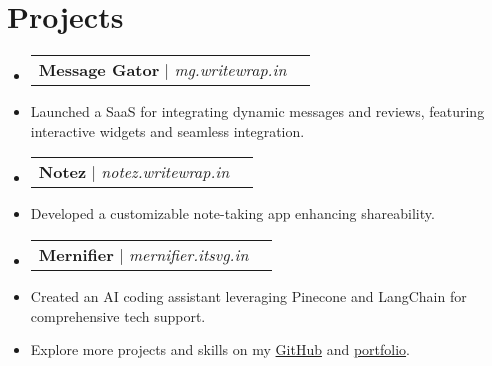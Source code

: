 \documentclass[letterpaper,11pt]{article}
\makeatletter
\newcommand{\resumeItem}[1]{
  \item\small{
    {#1 \vspace{-2pt}}
  }
}
\newcommand{\resumeProjectHeading}[2]{
    \vspace{-2pt}\item
    \begin{tabular*}{0.97\textwidth}{l@{\extracolsep{\fill}}r}
      \small#1 & #2 \\
    \end{tabular*}\vspace{-7pt}
}
\newcommand{\resumeSubHeadingListStart}{\begin{itemize}[leftmargin=0.15in, label={}]}
\newcommand{\resumeSubHeadingListEnd}{\end{itemize}}
\makeatother
\begin{document}
\section{Projects}
\resumeSubHeadingListStart

\resumeProjectHeading{\textbf{Message Gator} | \emph{mg.writewrap.in}}{}
\resumeItem{Launched a SaaS for integrating dynamic messages and reviews, featuring interactive widgets and seamless integration.}

\resumeProjectHeading{\textbf{Notez} | \emph{notez.writewrap.in}}{}
\resumeItem{Developed a customizable note-taking app enhancing shareability.}

\resumeProjectHeading{\textbf{Mernifier} | \emph{mernifier.itsvg.in}}{}
\resumeItem{Created an AI coding assistant leveraging Pinecone and LangChain for comprehensive tech support.}

\resumeItem{Explore more projects and skills on my \href{http://github.com/pushkarydv}{GitHub} and \href{https://pushkaryadav.in}{portfolio}.}

\resumeSubHeadingListEnd

\end{document}
